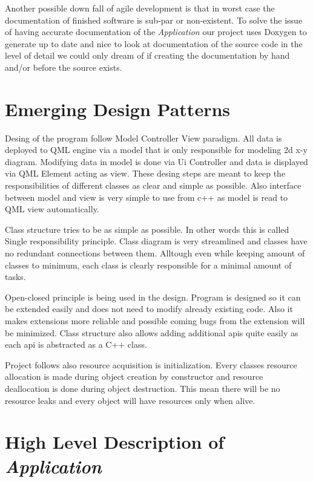 \documentclass{article}
\begin{document}
Another possible down fall of agile development is that in worst case the documentation of finished software is sub-par or non-existent. To solve the issue of having accurate documentation of the \emph{Application} our project uses Doxygen to generate up to date and nice to look at documentation of the source code in the level of detail we could only dream of if creating the documentation by hand and/or before the source exists.


\section{Emerging Design Patterns}	%

Desing of the program follow Model Controller View paradigm. All data is deployed
to QML engine via a model that is only responsible for modeling 2d x-y diagram.
Modifying data in model is done via Ui Controller and data is displayed via QML
Element acting as view. These desing steps are meant to keep the responsibilities of
different classes as clear and simple as possible. Also interface between model and
view is very simple to use from c++ as model is read to QML view automatically.

Class structure tries to be as simple as possible. In other words this is called Single
responsibility principle. Class diagram is very streamlined and classes have no
redundant connections between them. Alltough even while keeping amount of classes
to minimum, each class is clearly responsible for a minimal amount of tasks.

Open-closed principle is being used in the design. Program is designed so it can be
extended easily and does not need to modify already existing code. Also it makes
extensions more reliable and possible coming bugs from the extension will be
minimized. Class structure also allows adding additional apis quite easily as each api
is abstracted as a C++ class.

Project follows also resource acquisition is initialization. Every classes resource
allocation is made during object creation by constructor and resource deallocation is
done during object destruction. This mean there will be no resource leaks and every
object will have resources only when alive.


\newpage

\section{High Level Description of \emph{Application}} %
\end{document}
